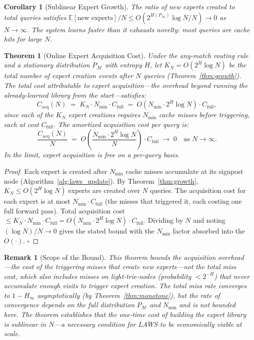 \documentclass[11pt]{article}
\newtheorem{theorem}{Theorem}
\newtheorem{corollary}{Corollary}
\newtheorem{remark}{Remark}
\begin{document}
\begin{corollary}[Sublinear Expert Growth]
The ratio of new experts created to total queries satisfies
$\mathbb{E}[\text{new experts}]/N \leq O(2^{H(P_{\mathcal{M}})} \log N / N)
\to 0$ as $N \to \infty$.
The system learns faster than it exhausts novelty: most queries are cache hits
for large $N$.
\end{corollary}

\begin{theorem}[Online Expert Acquisition Cost]
\label{thm:regret}
Under the any-match routing rule and a stationary distribution $P_{\mathcal{M}}$
with entropy $H$, let $K_N = O(2^H \log N)$ be the total number of expert
creation events after $N$ queries (Theorem~\ref{thm:growth}).  The total
cost attributable to expert \emph{acquisition}---the overhead beyond running
the already-learned library from the start---satisfies:
\[
  C_{\mathrm{acq}}(N) \;=\; K_N \cdot N_{\min} \cdot C_{\mathrm{full}}
  \;=\; O\!\left(N_{\min} \cdot 2^H \log N\right) \cdot C_{\mathrm{full}},
\]
since each of the $K_N$ expert creations requires $N_{\min}$ cache misses before
triggering, each at cost $C_{\mathrm{full}}$.  The amortized acquisition cost per query is:
\[
  \frac{C_{\mathrm{acq}}(N)}{N} \;=\; O\!\left(\frac{N_{\min} \cdot 2^H \log N}{N}\right) \cdot C_{\mathrm{full}}
  \;\to\; 0 \quad \text{as } N \to \infty.
\]
In the limit, expert acquisition is free on a per-query basis.
\end{theorem}

\begin{proof}
Each expert is created after $N_{\min}$ cache misses accumulate at its
signpost node (Algorithm~\ref{alg:laws_update}).  By Theorem~\ref{thm:growth},
$K_N \leq O(2^H \log N)$ experts are created over $N$ queries.  The acquisition
cost for each expert is at most $N_{\min} \cdot C_{\mathrm{full}}$ (the misses
that triggered it, each costing one full forward pass).  Total acquisition cost
$\leq K_N \cdot N_{\min} \cdot C_{\mathrm{full}} = O(N_{\min} \cdot 2^H \log N)
\cdot C_{\mathrm{full}}$.  Dividing by $N$ and noting $(\log N)/N \to 0$ gives
the stated bound with the $N_{\min}$ factor absorbed into the $O(\cdot)$. $\square$
\end{proof}

\begin{remark}[Scope of the Bound]
This theorem bounds the \emph{acquisition overhead}---the cost of the
triggering misses that create new experts---not the total miss cost, which
also includes misses on light-trie-nodes (probability $< 2^{-H}$) that never
accumulate enough visits to trigger expert creation.  The total miss rate
converges to $1 - H_\infty$ asymptotically (by Theorem~\ref{thm:monotone}),
but the rate of convergence depends on the full distribution $P_{\mathcal{M}}$
and $N_{\min}$ and is not bounded here.  The theorem establishes that the
one-time cost of building the expert library is sublinear in $N$---a necessary
condition for LAWS to be economically viable at scale.
\end{remark}
\end{document}
